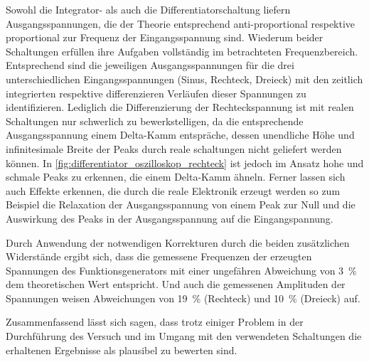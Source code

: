 Sowohl die Integrator- als auch die Differentiatorschaltung  liefern Ausgangsspannungen, die der Theorie
entsprechend anti-proportional respektive proportional zur Frequenz der Eingangsspannung sind. Wiederum 
beider Schaltungen erfüllen ihre Aufgaben vollständig im betrachteten Frequenzbereich.
Entsprechend sind die jeweiligen Ausgangsspannungen für die drei unterschiedlichen Eingangsspannungen
(Sinus, Rechteck, Dreieck) mit den zeitlich integrierten respektive differenzieren Verläufen 
dieser Spannungen zu identifizieren. Lediglich die Differenzierung der Rechteckspannung ist mit realen 
Schaltungen nur schwerlich zu bewerkstelligen, da die entsprechende Ausgangsspannung einem Delta-Kamm
entspräche, dessen unendliche Höhe und infinitesimale Breite der Peaks durch reale schaltungen 
nicht geliefert werden können. In \cref{fig:differentiator_oszilloskop_rechteck} ist jedoch im Ansatz 
hohe und schmale Peaks zu erkennen, die einem Delta-Kamm ähneln. Ferner lassen sich auch Effekte erkennen,
die durch die reale Elektronik erzeugt werden so zum Beispiel die Relaxation der Ausgangsspannung von einem 
Peak zur Null und die Auswirkung des Peaks in der Ausgangsspannung auf die Eingangspannung.

Durch Anwendung der notwendigen Korrekturen durch die beiden zusätzlichen Widerstände ergibt sich,
dass die gemessene Frequenzen der erzeugten Spannungen des Funktionsgenerators mit einer ungefähren 
Abweichung von \SI{3}{\percent} dem theoretischen Wert entspricht. Und auch die gemessenen Amplituden 
der Spannungen weisen Abweichungen von \SI{19}{\percent} (Rechteck) und \SI{10}{\percent} (Dreieck)
auf.

Zusammenfassend lässt sich sagen, dass trotz einiger Problem in der Durchführung des Versuch 
und im Umgang mit den verwendeten Schaltungen die erhaltenen Ergebnisse als plausibel zu bewerten sind.  



  


 